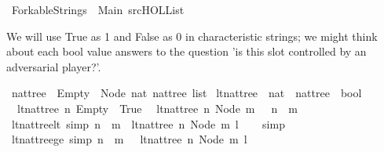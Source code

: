 %
\begin{isabellebody}%
%
%
\isadelimtheory
%
\endisadelimtheory
%
\isatagtheory
{}\isamarkupfalse%
\ Forkable{\isacharunderscore}Strings\ \ Main\ {\isachardoublequoteopen}{\isachartilde}{\isachartilde}{\isacharslash}src{\isacharslash}HOL{\isacharslash}List{\isachardoublequoteclose}\ %
\endisatagtheory
{\isafoldtheory}%
%
\isadelimtheory
%
\endisadelimtheory
%
\begin{isamarkuptext}%
We will use True as 1 and False as 0 in characteristic strings; we might think about each bool
value answers to the question 'is this slot controlled by an adversarial player?'.%
\end{isamarkuptext}\isamarkuptrue%
\isamarkupfalse%
\ nattree\ {\isacharequal}\ Empty\ {\isacharbar}\ Node\ nat\ {\isachardoublequoteopen}nattree\ list{\isachardoublequoteclose}\isanewline
\isanewline
\isanewline
{}\isamarkupfalse%
\ lt{\isacharunderscore}nat{\isacharunderscore}tree\ {\isacharcolon}{\isacharcolon}\ {\isachardoublequoteopen}nat\ {\isasymRightarrow}\ nattree\ {\isasymRightarrow}\ bool{\isachardoublequoteclose}\ \isanewline
\ \ {\isachardoublequoteopen}lt{\isacharunderscore}nat{\isacharunderscore}tree\ n\ Empty\ {\isacharequal}\ True{\isachardoublequoteclose}\ \isanewline
{\isacharbar}\ {\isachardoublequoteopen}lt{\isacharunderscore}nat{\isacharunderscore}tree\ n\ {\isacharparenleft}Node\ m\ {\isacharunderscore}{\isacharparenright}\ {\isacharequal}\ {\isacharparenleft}n\ {\isacharless}\ m{\isacharparenright}{\isachardoublequoteclose}\isanewline
\ \isanewline
{}\isamarkupfalse%
\ lt{\isacharunderscore}nat{\isacharunderscore}tree{\isacharunderscore}lt\ {\isacharbrackleft}simp{\isacharbrackright}{\isacharcolon}\ {\isachardoublequoteopen}{\isacharparenleft}n\ {\isacharless}\ m{\isacharparenright}\ {\isasymlongleftrightarrow}\ lt{\isacharunderscore}nat{\isacharunderscore}tree\ n\ {\isacharparenleft}Node\ m\ l{\isacharparenright}{\isachardoublequoteclose}\isanewline
%
\isadelimproof
\ \ %
\endisadelimproof
%
\isatagproof
{}\isamarkupfalse%
\ simp%
\endisatagproof
{\isafoldproof}%
%
\isadelimproof
\isanewline
%
\endisadelimproof
\ \ \ \ \isanewline
{}\isamarkupfalse%
\ lt{\isacharunderscore}nat{\isacharunderscore}tree{\isacharunderscore}ge\ {\isacharbrackleft}simp{\isacharbrackright}{\isacharcolon}\ {\isachardoublequoteopen}{\isacharparenleft}n\ {\isasymge}\ m{\isacharparenright}\ {\isasymlongleftrightarrow}\ {\isasymnot}\ lt{\isacharunderscore}nat{\isacharunderscore}tree\ n\ {\isacharparenleft}Node\ m\ l{\isacharparenright}{\isachardoublequoteclose}\isanewline

\end{isabellebody}
